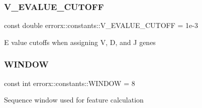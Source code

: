 \subsubsection{\texorpdfstring{V\_EVALUE\_CUTOFF}{V\_EVALUE\_CUTOFF}}
{\footnotesize\ttfamily const double errorx\+::constants\+::\+V\+\_\+\+E\+V\+A\+L\+U\+E\+\_\+\+C\+U\+T\+O\+FF = 1e-\/3}

E value cutoffs when assigning V, D, and J genes \mbox{\label{constants_8hh_file_acb2880ac79b3effae46d288c9401ec9b}} 
\subsubsection{\texorpdfstring{WINDOW}{WINDOW}}
{\footnotesize\ttfamily const int errorx\+::constants\+::\+W\+I\+N\+D\+OW = 8}

Sequence window used for feature calculation 